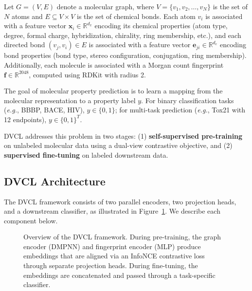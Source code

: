 \documentclass[a4paper,fleqn]{cas-sc}
\newcommand{\eg}{\textit{e.g.}}
\begin{document}
Let $G = (V, E)$ denote a molecular graph, where $V = \{v_1, v_2, \ldots, v_N\}$ is the set of $N$ atoms and $E \subseteq V \times V$ is the set of chemical bonds. Each atom $v_i$ is associated with a feature vector $\mathbf{x}_i \in \mathbb{R}^{d_x}$ encoding its chemical properties (atom type, degree, formal charge, hybridization, chirality, ring membership, etc.), and each directed bond $(v_j, v_i) \in E$ is associated with a feature vector $\mathbf{e}_{ji} \in \mathbb{R}^{d_e}$ encoding bond properties (bond type, stereo configuration, conjugation, ring membership). Additionally, each molecule is associated with a Morgan count fingerprint $\mathbf{f} \in \mathbb{R}^{2048}$, computed using RDKit with radius 2.

The goal of molecular property prediction is to learn a mapping from the molecular representation to a property label $y$. For binary classification tasks (\eg, BBBP, BACE, HIV), $y \in \{0, 1\}$; for multi-task prediction (\eg, Tox21 with 12 endpoints), $y \in \{0, 1\}^T$.

DVCL addresses this problem in two stages: (1) \textbf{self-supervised pre-training} on unlabeled molecular data using a dual-view contrastive objective, and (2) \textbf{supervised fine-tuning} on labeled downstream data.

\subsection{DVCL Architecture}\label{sec:architecture}

The DVCL framework consists of two parallel encoders, two projection heads, and a downstream classifier, as illustrated in Figure~\ref{fig:architecture}. We describe each component below.

\begin{figure}[!t]
\centering
{}
\caption{Overview of the DVCL framework. During pre-training, the graph encoder (DMPNN) and fingerprint encoder (MLP) produce embeddings that are aligned via an InfoNCE contrastive loss through separate projection heads. During fine-tuning, the embeddings are concatenated and passed through a task-specific classifier.}
\label{fig:architecture}
\end{figure}
\end{document}

